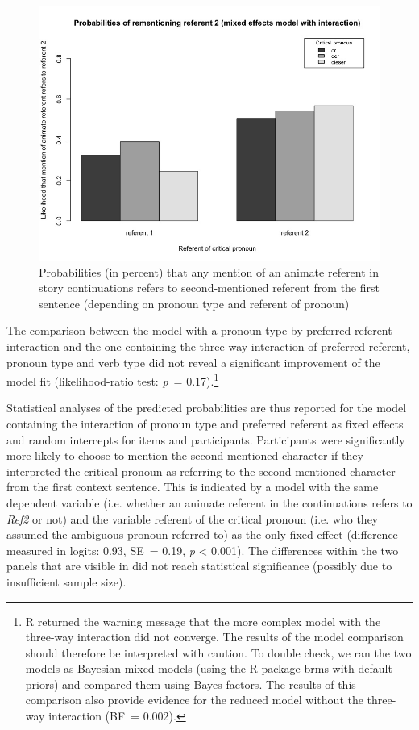 \documentclass[output=paper,colorlinks,citecolor=brown]{langscibook}
\begin{document}
\begin{figure}
\includegraphics[width=\textwidth]{figures/a8FuchsSchumacher20200420-img002.jpg}
\caption{Probabilities (in percent) that any mention of an animate referent in story continuations refers to second-mentioned referent from the first sentence (depending on pronoun type and referent of pronoun)}
\label{fig:fuchs:2}
\end{figure}

The comparison between the model with a pronoun type by preferred referent interaction and the one containing the three-way interaction of preferred referent, pronoun type and verb type did not reveal a significant improvement of the model fit (likelihood-ratio test: \textit{p}~= 0.17).\footnote{R returned the warning message that the more complex model with the three-way interaction did not converge. The results of the model comparison should therefore be interpreted with caution. To double check, we ran the two models as Bayesian mixed models (using the R package brms \citep{Bürkner2017} with default priors) and compared them using Bayes factors. The results of this comparison also provide evidence for the reduced model without the three-way interaction (BF~= 0.002).} 

Statistical analyses of the predicted probabilities are thus reported for the model containing the interaction of pronoun type and preferred referent as fixed effects and random intercepts for items and participants. Participants were significantly more likely to choose to mention the second-mentioned character if they interpreted the critical pronoun as referring to the second-mentioned character from the first context sentence. This is indicated by a model with the same dependent variable (i.e. whether an animate referent in the continuations refers to \textit{Ref2} or not) and the variable referent of the critical pronoun (i.e. who they assumed the ambiguous pronoun referred to) as the only fixed effect (difference measured in logits: 0.93, SE~= 0.19, \textit{p} < 0.001). The differences within the two panels that are visible in  did not reach statistical significance (possibly due to insufficient sample size). 
\end{document}
